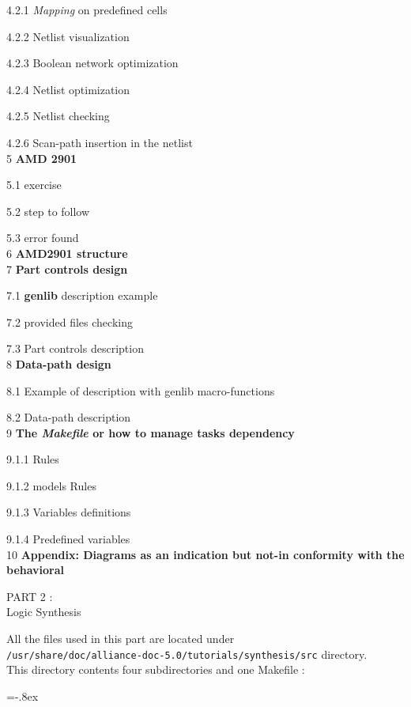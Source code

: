 \documentclass{article}
\begin{document}
{\hspace{0.5cm} {4.2.1} {\it Mapping} on predefined cells

\hspace{0.5cm} {4.2.2} Netlist visualization

\hspace{0.5cm} {4.2.3} Boolean network optimization

\hspace{0.5cm} {4.2.4} Netlist optimization 

\hspace{0.5cm} {4.2.5} Netlist checking

\hspace{0.5cm} {4.2.6} Scan-path insertion in the netlist
\\
 {5} {\bf AMD 2901}

 {5.1} exercise

 {5.2} step to follow

 {5.3} error found
\\
 {6} {\bf AMD2901 structure}
\\
 {7} {\bf Part controls design }

 {7.1}{ \bf genlib } description example 

 {7.2} provided files checking

 {7.3} Part controls description
\\
 {8} {\bf Data-path design}

 {8.1} Example of description with genlib macro-functions

 {8.2} Data-path description
\\
{9} {\bf The { \it Makefile } or how to manage tasks dependency }

 {9.1.1} Rules

 {9.1.2} models Rules

 {9.1.3} Variables definitions 

 {9.1.4} Predefined variables
\\
 {10} {\bf Appendix: Diagrams as an indication but not-in conformity with the behavioral}


\newpage
       {\huge
        PART 2 :\\ }
        \vspace{1cm}
        {\huge
        Logic Synthesis
        }

All the files used in this part are located under \\
\texttt{/usr/share/doc/alliance-doc-5.0/tutorials/synthesis/src} directory.\\
This directory contents four subdirectories and one Makefile :
\begin{itemize}\itemsep=-.8ex


\end{itemize}}
\end{document}
